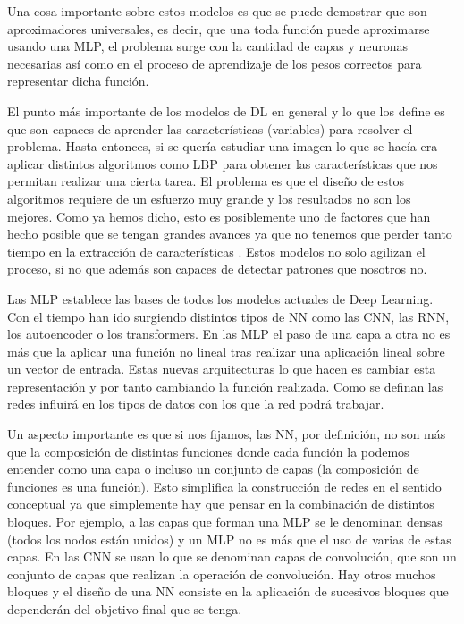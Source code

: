 \documentclass[a4paper,12pt,twoside,titlepage]{article}
\begin{document}
Una cosa importante sobre estos modelos es que se puede demostrar que son aproximadores universales, es decir, que una toda función puede aproximarse usando una MLP, el problema surge con la cantidad de capas y neuronas necesarias así como en el proceso de aprendizaje de los pesos correctos para representar dicha función.

El punto más importante de los modelos de DL en general y lo que los define es que son capaces de aprender las características (variables) para resolver el problema. Hasta entonces, si se quería estudiar una imagen lo que se hacía era aplicar distintos algoritmos como LBP para obtener las características que nos permitan realizar una cierta tarea. El problema es que el diseño de estos algoritmos requiere de un esfuerzo muy grande y los resultados no son los mejores. Como ya hemos dicho, esto es posiblemente uno de factores que han hecho posible que se tengan grandes avances ya que no tenemos que perder tanto tiempo en la extracción de características \cite{dl_nature}. Estos modelos no solo agilizan el proceso, si no que además son capaces de detectar patrones que nosotros no.

Las MLP establece las bases de todos los modelos actuales de Deep Learning. Con el tiempo han ido surgiendo distintos tipos de NN como las CNN, las RNN, los autoencoder o los transformers. En las MLP el paso de una capa a otra no es más que la aplicar una función no lineal tras realizar una aplicación lineal sobre un vector de entrada. Estas nuevas arquitecturas lo que hacen es cambiar esta representación y por tanto cambiando la función realizada. Como se definan las redes influirá en los tipos de datos con los que la red podrá trabajar. 

Un aspecto importante es que si nos fijamos, las NN, por definición, no son más que la composición de distintas funciones donde cada función la podemos entender como una capa o incluso un conjunto de capas (la composición de funciones es una función). Esto simplifica la construcción de redes en el sentido conceptual ya que simplemente hay que pensar en la combinación de distintos bloques. Por ejemplo, a las capas que forman una MLP se le denominan densas (todos los nodos están unidos) y un MLP no es más que el uso de varias de estas capas. En las CNN se usan lo que se denominan capas de convolución, que son un conjunto de capas que realizan la operación de convolución. Hay otros muchos bloques y el diseño de una NN consiste en la aplicación de sucesivos bloques que dependerán del objetivo final que se tenga.
\end{document}

